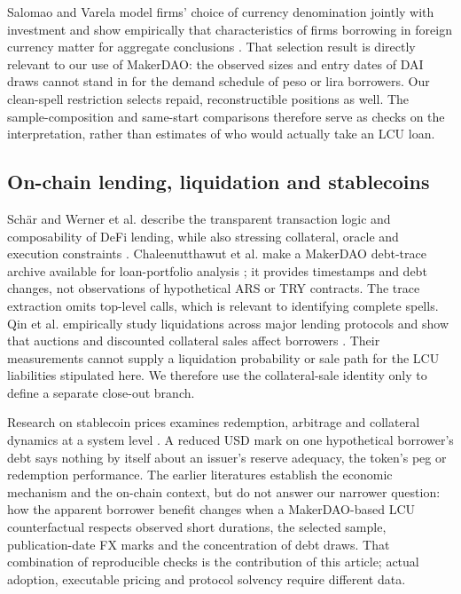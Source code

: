 \documentclass[sn-vancouver,Numbered]{sn-jnl}
\begin{document}
Salomao and Varela model firms' choice of currency denomination jointly with investment and show empirically that characteristics of firms borrowing in foreign currency matter for aggregate conclusions \cite{SalomaoVarela2022}. That selection result is directly relevant to our use of MakerDAO: the observed sizes and entry dates of DAI draws cannot stand in for the demand schedule of peso or lira borrowers. Our clean-spell restriction selects repaid, reconstructible positions as well. The sample-composition and same-start comparisons therefore serve as checks on the interpretation, rather than estimates of who would actually take an LCU loan.

\subsection{On-chain lending, liquidation and stablecoins}
Sch\"ar and Werner et al. describe the transparent transaction logic and composability of DeFi lending, while also stressing collateral, oracle and execution constraints \cite{Schar2021,Werner2022}. Chaleenutthawut et al. make a MakerDAO debt-trace archive available for loan-portfolio analysis \cite{Chaleenutthawut2024}; it provides timestamps and debt changes, not observations of hypothetical ARS or TRY contracts. The trace extraction omits top-level calls, which is relevant to identifying complete spells. Qin et al. empirically study liquidations across major lending protocols and show that auctions and discounted collateral sales affect borrowers \cite{Qin2021Liquidations}. Their measurements cannot supply a liquidation probability or sale path for the LCU liabilities stipulated here. We therefore use the collateral-sale identity only to define a separate close-out branch.

Research on stablecoin prices examines redemption, arbitrage and collateral dynamics at a system level \cite{Lyons2023,KlagesMundt2022,GortonZhang2023}. A reduced USD mark on one hypothetical borrower's debt says nothing by itself about an issuer's reserve adequacy, the token's peg or redemption performance. The earlier literatures establish the economic mechanism and the on-chain context, but do not answer our narrower question: how the apparent borrower benefit changes when a MakerDAO-based LCU counterfactual respects observed short durations, the selected sample, publication-date FX marks and the concentration of debt draws. That combination of reproducible checks is the contribution of this article; actual adoption, executable pricing and protocol solvency require different data.
\end{document}
